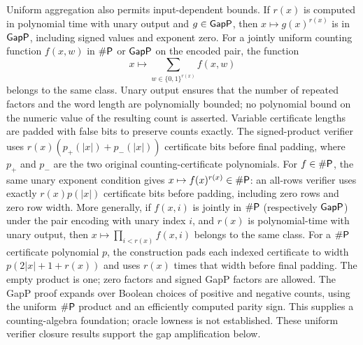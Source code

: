 \begin{result}
Uniform aggregation also permits input-dependent bounds. If $r(x)$ is computed in
polynomial time with unary output and $g\in\mathsf{GapP}$, then
$x\mapsto g(x)^{r(x)}$ is in $\mathsf{GapP}$, including signed values and exponent zero.
For a jointly uniform counting function $f(x,w)$ in $\#\mathsf{P}$ or $\mathsf{GapP}$
on the encoded pair, the function
\[
x\longmapsto\sum_{w\in\{0,1\}^{r(x)}} f(x,w)
\]
belongs to the same class. Unary output ensures that the number of repeated
factors and the word length are polynomially bounded; no polynomial bound on
the numeric value of the resulting count is asserted. Variable certificate
lengths are padded with false bits to preserve counts exactly. The signed-product
verifier uses $r(x)(p_+(|x|)+p_-(|x|))$ certificate bits before final padding,
where $p_+$ and $p_-$ are the two original counting-certificate polynomials.
For $f\in\#\mathsf{P}$, the same unary exponent condition gives
$x\mapsto f(x)^{r(x)}\in\#\mathsf{P}$: an all-rows verifier uses exactly
$r(x)p(|x|)$ certificate bits before padding, including zero rows and zero row width.
More generally, if $f(x,i)$ is jointly in $\#\mathsf{P}$ (respectively $\mathsf{GapP}$)
under the pair encoding with unary index $i$, and $r(x)$ is polynomial-time with unary output,
then $x\mapsto\prod_{i<r(x)}f(x,i)$ belongs to the same class. For a $\#\mathsf{P}$
certificate polynomial $p$, the construction pads each indexed certificate to width
$p(2|x|+1+r(x))$ and uses $r(x)$ times that width before final padding. The empty
product is one; zero factors and signed GapP factors are allowed. The GapP proof expands
over Boolean choices of positive and negative counts, using the uniform $\#\mathsf{P}$
product and an efficiently computed parity sign. This supplies a counting-algebra
foundation; oracle lowness is not established.
These uniform verifier closure results support the gap amplification below.
\citep{FennerFortnowKurtz1994}
\end{result}

